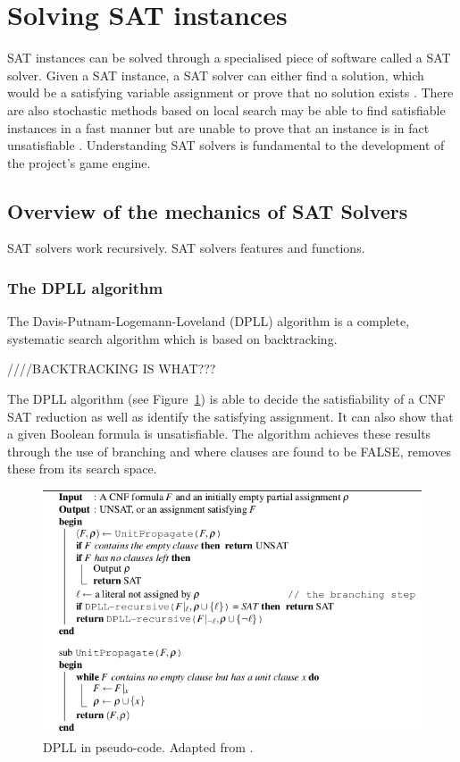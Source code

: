 \documentclass[11pt, a4paper, oneside]{report} %
\begin{document}
\section{Solving SAT instances}

SAT instances can be solved through a specialised piece of software called a SAT
solver.  Given a SAT instance, a SAT solver can either find a solution, which
would be a satisfying variable assignment or prove that no solution exists
\cite{zhang2002quest}. There are also stochastic methods based on local search
may be able to find satisfiable instances in a fast manner but are unable to
prove that an instance is in fact unsatisfiable \cite{gomes2008satisfiability}.
Understanding SAT solvers is fundamental to the development of the project's
game engine.

\subsection{Overview of the mechanics of SAT Solvers}

SAT solvers work recursively. SAT solvers features and functions.


\subsubsection{The DPLL algorithm}

The Davis-Putnam-Logemann-Loveland (DPLL) algorithm \cite{davis1962machine} is a
complete, systematic search algorithm which is based on backtracking. 

////BACKTRACKING IS WHAT???

The DPLL algorithm (see Figure~\ref{DPLL}) is able to decide the satisfiability
of a CNF SAT reduction as well as identify the satisfying assignment. It can
also show that a given Boolean formula is unsatisfiable. The algorithm achieves
these results through the use of branching and where clauses are found to be
FALSE, removes these from its search space.

\begin{figure}[h!]

  \centering
    \includegraphics[scale=0.47]{dpll}
  \caption{DPLL in pseudo-code. Adapted from \cite{balyo2010solving,gomes2008satisfiability}.}
  \label{DPLL}
\end{figure}
\end{document}
